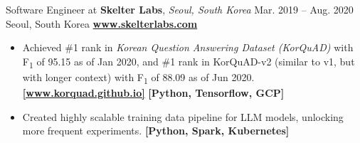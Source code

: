 \cveventflat
{Software Engineer at }
{\textbf{Skelter Labs}, \textit{Seoul, South Korea}}
{Mar. 2019 -- Aug. 2020}
{Seoul, South Korea}
\newline
\href{https://www.skelterlabs.com/}{\textbf{www.skelterlabs.com}}
\begin{itemize}
    \item {
        Achieved \#1 rank in \textit{Korean Question Answering Dataset (KorQuAD)}
        with F\textsubscript{1} of 95.15 as of Jan 2020, and \#1 rank in KorQuAD-v2
        (similar to v1, but with longer context) with F\textsubscript{1} of 88.09 as of Jun 2020.
    }
    \newline
    \href{https://korquad.github.io/}{\textbf{[www.korquad.github.io]}}
    \textbf{[Python, Tensorflow, GCP]}
    \item Created highly scalable training data pipeline for LLM models, unlocking more frequent experiments.
    \textbf{[Python, Spark, Kubernetes]}
\end{itemize}

